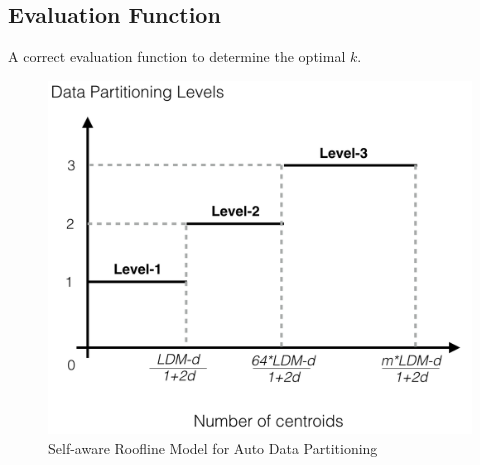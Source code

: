 \documentclass[10pt,journal,compsoc]{IEEEtran}
\begin{document}
\subsection{Evaluation Function}
A correct evaluation function to determine the optimal $k$.



\begin{figure}
\centering
\includegraphics[scale=0.45]{roofline.png}
\caption{Self-aware Roofline Model for Auto Data Partitioning}
\label{roofline}
\end{figure}


\end{document}
